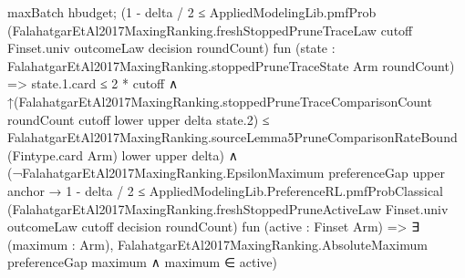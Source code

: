 \documentclass[10pt]{article}
\begin{document}
\begin{ReviewVerbatim}
                          maxBatch hbudget;
                      (1 - delta / 2 ≤
                          AppliedModelingLib.pmfProb
                            (FalahatgarEtAl2017MaxingRanking.freshStoppedPruneTraceLaw cutoff Finset.univ outcomeLaw
                              decision roundCount)
                            fun (state : FalahatgarEtAl2017MaxingRanking.stoppedPruneTraceState Arm roundCount) =>
                            state.1.card ≤ 2 * cutoff ∧
                              ↑(FalahatgarEtAl2017MaxingRanking.stoppedPruneTraceComparisonCount roundCount cutoff lower
                                    upper delta state.2) ≤
                                FalahatgarEtAl2017MaxingRanking.sourceLemma5PruneComparisonRateBound (Fintype.card Arm)
                                  lower upper delta) ∧
                        (¬FalahatgarEtAl2017MaxingRanking.EpsilonMaximum preferenceGap upper anchor →
                          1 - delta / 2 ≤
                            AppliedModelingLib.PreferenceRL.pmfProbClassical
                              (FalahatgarEtAl2017MaxingRanking.freshStoppedPruneActiveLaw Finset.univ outcomeLaw cutoff
                                decision roundCount)
                              fun (active : Finset Arm) =>
                              ∃ (maximum : Arm),
                                FalahatgarEtAl2017MaxingRanking.AbsoluteMaximum preferenceGap maximum ∧
                                  maximum ∈ active)
\end{ReviewVerbatim}
\end{document}
